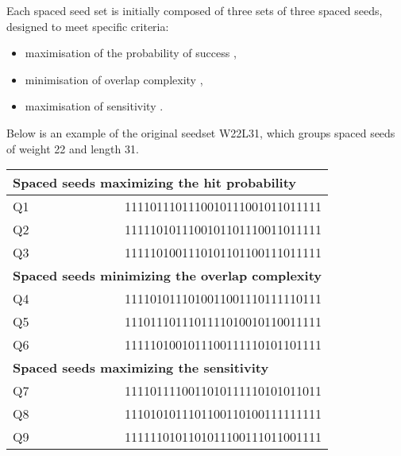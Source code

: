 	Each spaced seed set is initially composed of three sets of three spaced seeds, designed to meet specific criteria:
	\begin{itemize}
		\item maximisation of the probability of success \cite{ounit2016higher},
		\item minimisation of overlap complexity \cite{hahn2016rasbhari},
		\item maximisation of sensitivity \cite{hahn2016rasbhari}.
	\end{itemize}
	
	
	\begin{example}
		Below is an example of the original seedset W22L31, which groups spaced seeds of weight 22 and length 31.
		\begin{center}
			\begin{tabular}{l r}
				\multicolumn{2}{l}{\bfseries Spaced seeds maximizing the hit probability} \\
				\toprule
				Q1 & 1111011101110010111001011011111 \\
				Q2 & 1111101011100101101110011011111 \\
				Q3 & 1111101001110101101100111011111 \\
				\midrule
				\multicolumn{2}{l}{\bfseries Spaced seeds minimizing the overlap complexity} \\
				\toprule
				Q4 & 1111010111010011001110111110111 \\
				Q5 & 1110111011101111010010110011111 \\
				Q6 & 1111101001011100111110101101111 \\
				\midrule
				\multicolumn{2}{l}{\bfseries Spaced seeds maximizing the sensitivity} \\
				\toprule
				Q7 & 1111011110011010111110101011011 \\
				Q8 & 1110101011101100110100111111111 \\
				Q9 & 1111110101101011100111011001111 \\
				\bottomrule
			\end{tabular}
		\end{center}
	\end{example}
	
